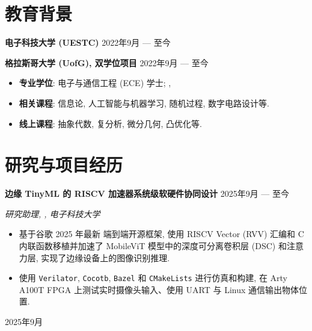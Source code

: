 \section{教育背景}

\textbf{电子科技大学 (UESTC)} \hfill 2022年9月 --- 至今

\textbf{格拉斯哥大学 (UofG), 双学位项目} \hfill 2022年9月 --- 至今

\begin{itemize}
    \setlength\itemsep{-0.5em}
    \item \textbf{专业学位}: 电子与通信工程 (ECE) 学士; , 
    \item \textbf{相关课程}: 信息论, 人工智能与机器学习, 随机过程, 数字电路设计等.
    \item \textbf{线上课程}: 抽象代数, 复分析, 微分几何, 凸优化等.
\end{itemize}


\section{研究与项目经历}

\textbf{边缘 TinyML 的 RISCV 加速器系统级软硬件协同设计} \hfill 2025年9月 --- 至今

\vspace{-0.5em} \begin{small} \textit{研究助理, , 电子科技大学} \end{small} \vspace{-0.5em}

\begin{itemize}
    \setlength\itemsep{-0.5em}
    \item 基于谷歌 2025 年最新  端到端开源框架, 使用 RISCV Vector (RVV) 汇编和 C 内联函数移植并加速了 MobileViT 模型中的深度可分离卷积层 (DSC) 和注意力层, 实现了边缘设备上的图像识别推理.
    \item 使用 \texttt{Verilator}, \texttt{Cocotb}, \texttt{Bazel} 和 \texttt{CMakeLists} 进行仿真和构建, 在 Arty A100T FPGA 上测试实时摄像头输入、使用 UART 与 Linux 通信输出物体位置.
\end{itemize}

 \hfill 2025年9月

